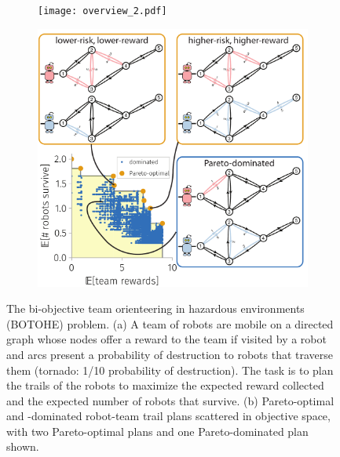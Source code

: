 \documentclass[fleqn,10pt,lineno]{wlpeerj}
\begin{document}
\begin{figure}[h!]
    \centering
     \begin{subfigure}[b]{0.62\textwidth}
    	\texttt{[image: overview\_2.pdf]}
	\caption{} \label{fig:overview}
    \end{subfigure}
    \begin{subfigure}[b]{0.66\textwidth}
    	\includegraphics[width=\textwidth]{toy_pareto_front2.pdf}
	\caption{} \label{fig:pareto_optimal}
    \end{subfigure}
    \caption{
      The bi-objective team orienteering in hazardous environments (BOTOHE) problem.
      (a) A team of robots are mobile on a directed graph whose 
      nodes offer a reward to the team if visited by a robot and 
      arcs present a probability of destruction to robots that traverse them (tornado: 1/10 probability of destruction). The task is to plan the trails of the robots to maximize the expected reward collected and the expected number of robots that survive.
      (b) Pareto-optimal and -dominated robot-team trail plans scattered in objective space, with two Pareto-optimal plans and one Pareto-dominated plan shown.}
\end{figure}
\end{document}
